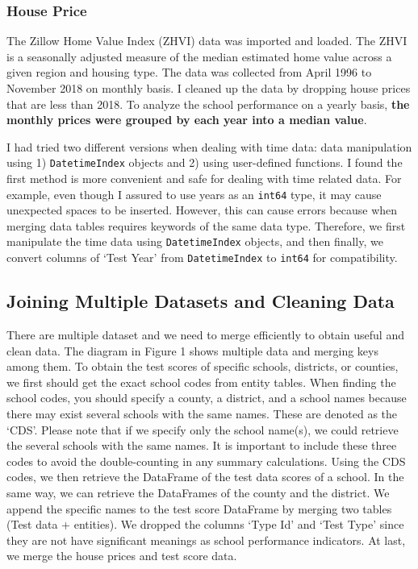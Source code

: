 \documentclass[11pt]{article}
\begin{document}
\subsubsection{House Price}

The Zillow Home Value Index (ZHVI) data \cite{Zillow_research_data} was imported and loaded. The ZHVI is a seasonally adjusted measure of the median estimated home value across a given region and housing type. The data was collected from April 1996 to November 2018 on monthly basis. I cleaned up the data by dropping house prices that are less than 2018. To analyze the school performance on a yearly basis, \textbf{the monthly prices were grouped by each year into a median value}.

I had tried two different versions when dealing with time data: data manipulation using 1) \texttt{DatetimeIndex} objects and 2) using user-defined functions. I found the first method is more convenient and safe for dealing with time related data. For example, even though I assured to use years as an \texttt{int64} type, it may cause unexpected spaces to be inserted. However, this can cause errors because when merging data tables requires keywords of the same data type. Therefore, we first manipulate the time data using \texttt{DatetimeIndex} objects, and then finally, we
convert columns of `Test Year' from \texttt{DatetimeIndex} to \texttt{int64} for compatibility.


\subsection{Joining Multiple Datasets and Cleaning Data}
There are multiple dataset and we need to merge efficiently to obtain useful and clean data. The diagram in Figure 1 shows multiple data and merging keys among them. 
To obtain the test scores of specific schools, districts, or counties, we first should get the exact school codes from entity tables. When finding the school codes, you should specify a county, a district, and a school names because there may exist several schools with the same names. These are denoted as the ‘CDS’. Please note that if we specify only the school name(s), we could retrieve the several schools with the same names. It is important to include these three codes to avoid the double-counting in any summary calculations.
Using the CDS codes, we then retrieve the DataFrame of the test data scores of a school. In the same way, we can retrieve the DataFrames of the county and the district. We append the specific names to the test score DataFrame by merging two tables (Test data + entities). We dropped the columns ‘Type Id’ and ‘Test Type’ since they are not have significant meanings as school performance indicators.
At last, we merge the house prices and test score data. 
\end{document}
